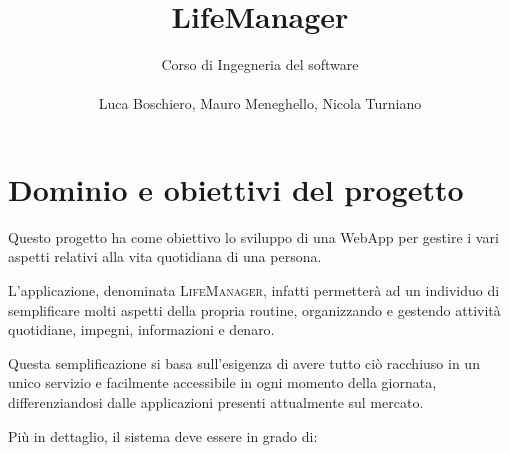 \documentclass[a4paper,12pt]{article}
\title{LifeManager}
\author{
 Corso di Ingegneria del software\\ \\Luca Boschiero, Mauro Meneghello, Nicola Turniano
 }
\begin{document}
 
 \maketitle
 \thispagestyle{fancy}
 




\section*{Dominio e obiettivi del progetto}
Questo progetto ha come obiettivo lo sviluppo di una WebApp per gestire i vari aspetti relativi alla vita quotidiana di una persona. 

L'applicazione, denominata {\scshape LifeManager}, infatti permetterà ad un individuo di semplificare molti aspetti della propria routine, organizzando e gestendo attività quotidiane, impegni, informazioni e denaro. 

Questa semplificazione si basa sull'esigenza di avere tutto ciò racchiuso in un unico servizio e facilmente accessibile in ogni momento della giornata, differenziandosi dalle applicazioni presenti attualmente sul mercato.

Più in dettaglio, il sistema deve essere in grado di:
\end{document}

